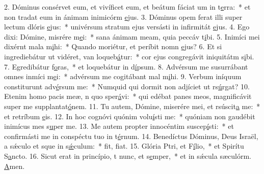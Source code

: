 2. Dóminus consérvet eum, et vivíficet eum, et beátum fáciat um in t\uline{e}rra:~* et non tradat eum in ánimam inimicórm \uline{e}jus.
3. Dóminus opem ferat illi super lectum dlóris \uline{e}jus:~* univérsum stratum ejus versásti in infirmitát \uline{e}jus.
4. Ego dixi: Dómine, misrére m\uline{e}i:~* sana ánimam meam, quia peccáv t\uline{i}bi.
5. Inimíci mei dixérnt mala m\uline{i}hi:~* Quando moriétur, et períbit nomn \uline{e}jus?
6. Et si ingrediebátur ut vidéret, van loqueb\uline{á}tur:~* cor ejus congregávit iniquitátm s\uline{i}bi.
7. Egredibátur f\uline{o}ras,~* et loquebátur in d\uline{í}psum.
8. Advérsum me susurrábant omnes inmíci m\uline{e}i:~* advérsum me cogitábant mal m\uline{i}hi.
9. Verbum iníquum constiturunt adv\uline{é}rsum me:~* Numquid qui dormit non adjíciet ut rs\uline{ú}rgat?
10. Etenim homo pacis meæ, n quo sper\uline{á}vi:~* qui edébat panes meos, magnificávit super me supplantat\uline{ó}nem.
11. Tu autem, Dómine, miserére mei, et rsúscit\uline{a} me:~* et retríbum \uline{e}is.
12. In hoc cognóvi quónim volu\uline{í}sti me:~* quóniam non gaudébit inimícus mes s\uline{u}per me.
13. Me autem propter innocéntim suscep\uline{í}sti:~* et confirmásti me in conspéctu tuo in t\uline{é}rnum.
14. Benedíctus Dóminus, Deus Israël, a sǽculo et sque in s\uline{ǽ}culum:~* fit, f\uline{i}at.
15. Glória Ptri, et F\uline{í}lio,~* et Spirítu S\uline{a}ncto.
16. Sicut erat in princípio, t nunc, et s\uline{e}mper,~* et in sǽcula sæculórm. \uline{A}men.
